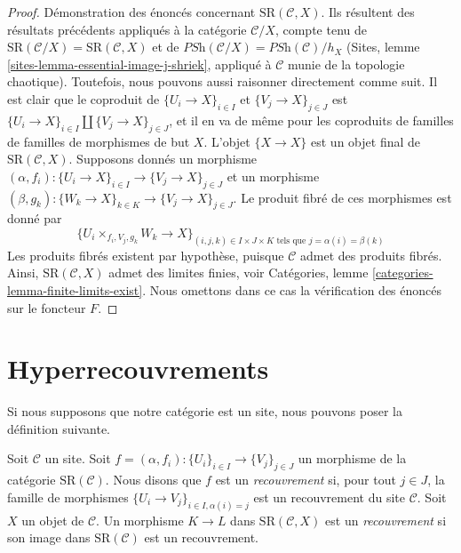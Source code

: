 \begin{proof}
\medskip\noindent
Démonstration des énoncés concernant $\text{SR}(\mathcal{C}, X)$.
Ils résultent des résultats précédents appliqués à la catégorie
$\mathcal{C}/X$, compte tenu de
$\text{SR}(\mathcal{C}/X) = \text{SR}(\mathcal{C}, X)$ et de
$\textit{PSh}(\mathcal{C}/X) = \textit{PSh}(\mathcal{C})/h_X$
(Sites, lemme \ref{sites-lemma-essential-image-j-shriek}, appliqué
à $\mathcal{C}$ munie de la topologie chaotique). Toutefois,
nous pouvons aussi raisonner directement comme suit.
Il est clair que le coproduit de
$\{U_i \to X\}_{i \in I}$ et $\{V_j \to X\}_{j \in J}$
est $\{U_i \to X\}_{i \in I} \amalg \{V_j \to X\}_{j \in J}$,
et il en va de même pour les coproduits de
familles de familles de morphismes de but $X$.
L'objet $\{X \to X\}$ est un objet
final de $\text{SR}(\mathcal{C}, X)$.
Supposons donnés un morphisme
$(\alpha, f_i) : \{U_i \to X\}_{i \in I} \to \{V_j \to X\}_{j \in J}$
et un morphisme
$(\beta, g_k) : \{W_k \to X\}_{k \in K} \to \{V_j \to X\}_{j \in J}$.
Le produit fibré de ces morphismes est donné par
$$
\{ U_i \times_{f_i, V_j, g_k} W_k \to X \}_{(i, j, k) \in I \times J \times K
\text{ tels que } j = \alpha(i) = \beta(k)}
$$
Les produits fibrés existent par hypothèse, puisque
$\mathcal{C}$ admet des produits fibrés.
Ainsi, $\text{SR}(\mathcal{C}, X)$ admet des limites finies,
voir Catégories, lemme \ref{categories-lemma-finite-limits-exist}.
Nous omettons dans ce cas la vérification des énoncés sur le foncteur $F$.
\end{proof}





\section{Hyperrecouvrements}
\label{section-hypercoverings}

\noindent
Si nous supposons que notre catégorie est un site, nous pouvons poser la
définition suivante.

\begin{definition}
\label{definition-covering-SR}
Soit $\mathcal{C}$ un site. Soit
$f = (\alpha, f_i) : \{U_i\}_{i \in I} \to \{V_j\}_{j \in J}$
un morphisme de la catégorie $\text{SR}(\mathcal{C})$.
Nous disons que $f$ est un {\it recouvrement} si, pour tout $j \in J$, la
famille de morphismes $\{U_i \to V_j\}_{i \in I, \alpha(i) = j}$
est un recouvrement du site $\mathcal{C}$.
Soit $X$ un objet de $\mathcal{C}$.
Un morphisme $K \to L$ dans $\text{SR}(\mathcal{C}, X)$ est
un {\it recouvrement} si son image dans $\text{SR}(\mathcal{C})$ est
un recouvrement.
\end{definition}

